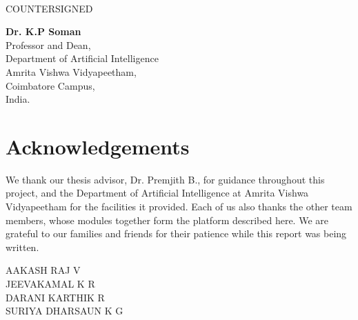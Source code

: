 \documentclass[a4paper, 12pt]{report}
\theoremstyle{definition}
\begin{document}
	\vspace*{1cm}
	 \\
	\vfill
	\begin{center}
		\large{COUNTERSIGNED}\\
	\end{center}
	\vspace{0.6in}

\begin{center}
		\textbf{Dr. K.P Soman}\\
	Professor and Dean, \\
	Department of Artificial Intelligence \\ Amrita Vishwa Vidyapeetham,\\
	Coimbatore Campus,\\
	India.
\end{center}

	\clearpage
	\tableofcontents

	\chapter*{Acknowledgements}
	We thank our thesis advisor, Dr. Premjith B., for guidance throughout this project, and the Department of Artificial Intelligence at Amrita Vishwa Vidyapeetham for the facilities it provided. Each of us also thanks the other team members, whose modules together form the platform described here. We are grateful to our families and friends for their patience while this report was being written.\\
	\vspace{1cm}
	\begin{flushright}
		AAKASH RAJ V \\ JEEVAKAMAL K R \\ DARANI KARTHIK R \\ SURIYA DHARSAUN K G
	\end{flushright}
	\listoffigures
	\listoftables
	\newpage
\end{document}
